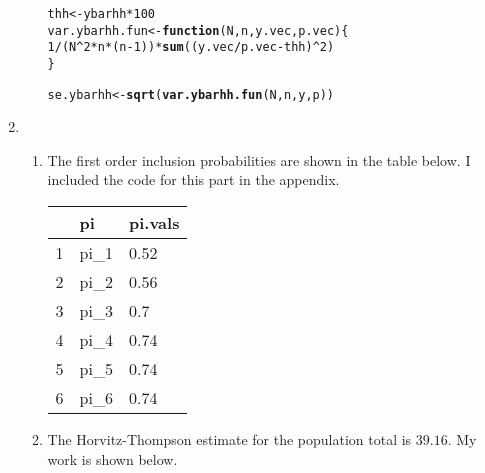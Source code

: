 \documentclass[12pt]{article}\usepackage[]{graphicx}\usepackage[]{color}
\makeatletter
\newcommand{\hlnum}[1]{\textcolor[rgb]{0.686,0.059,0.569}{#1}}%
\newcommand{\hlopt}[1]{\textcolor[rgb]{0,0,0}{#1}}%
\newcommand{\hlstd}[1]{\textcolor[rgb]{0.345,0.345,0.345}{#1}}%
\newcommand{\hlkwa}[1]{\textcolor[rgb]{0.161,0.373,0.58}{\textbf{#1}}}%
\newcommand{\hlkwb}[1]{\textcolor[rgb]{0.69,0.353,0.396}{#1}}%
\newcommand{\hlkwc}[1]{\textcolor[rgb]{0.333,0.667,0.333}{#1}}%
\newcommand{\hlkwd}[1]{\textcolor[rgb]{0.737,0.353,0.396}{\textbf{#1}}}%
\newenvironment{kframe}{%
 \def\at@end@of@kframe{}%
 \ifinner\ifhmode%
  \def\at@end@of@kframe{\end{minipage}}%
  \begin{minipage}{\columnwidth}%
 \fi\fi%
 \def\FrameCommand##1{\hskip\@totalleftmargin \hskip-\fboxsep
 \colorbox{shadecolor}{##1}\hskip-\fboxsep
     \hskip-\linewidth \hskip-\@totalleftmargin \hskip\columnwidth}%
 \MakeFramed {\advance\hsize-\width
   \@totalleftmargin\z@ \linewidth\hsize
   \@setminipage}}%
 {\par\unskip\endMakeFramed%
 \at@end@of@kframe}
\newenvironment{knitrout}{}{} %
\makeatother
\begin{document}
\begin{doublespacing}
\begin{enumerate}
\begin{enumerate}
\begin{singlespace}
\begin{knitrout}\footnotesize
{}\color{fgcolor}\begin{kframe}
\begin{alltt}
\hlstd{thh} \hlkwb{<-} \hlstd{ybarhh}\hlopt{*}\hlnum{100}
\hlstd{var.ybarhh.fun} \hlkwb{<-} \hlkwa{function}\hlstd{(}\hlkwc{N}\hlstd{,} \hlkwc{n}\hlstd{,} \hlkwc{y.vec}\hlstd{,} \hlkwc{p.vec}\hlstd{) \{}
  \hlnum{1}\hlopt{/}\hlstd{(N}\hlopt{^}\hlnum{2}\hlopt{*}\hlstd{n}\hlopt{*}\hlstd{(n}\hlopt{-}\hlnum{1}\hlstd{))}\hlopt{*}\hlkwd{sum}\hlstd{((y.vec}\hlopt{/}\hlstd{p.vec}\hlopt{-}\hlstd{thh)}\hlopt{^}\hlnum{2}\hlstd{)}
\hlstd{\}}

\hlstd{se.ybarhh} \hlkwb{<-} \hlkwd{sqrt}\hlstd{(}\hlkwd{var.ybarhh.fun}\hlstd{(N, n, y, p))}
\end{alltt}
\end{kframe}
\end{knitrout}
\end{singlespace}

\end{enumerate}

\item \begin{enumerate}

\item The first order inclusion probabilities are shown in the table below. I included the code for this part in the appendix.
\begin{table}[ht]
\centering
\begin{tabular}{rll}
  \hline
 & pi & pi.vals \\ 
  \hline
1 & pi\_1 & 0.52 \\ 
  2 & pi\_2 & 0.56 \\ 
  3 & pi\_3 & 0.7 \\ 
  4 & pi\_4 & 0.74 \\ 
  5 & pi\_5 & 0.74 \\ 
  6 & pi\_6 & 0.74 \\ 
   \hline
\end{tabular}
\end{table}


\item The Horvitz-Thompson estimate for the population total is $39.16$. My work is shown below.


\end{enumerate}
\end{enumerate}
\end{doublespacing}
\end{document}
